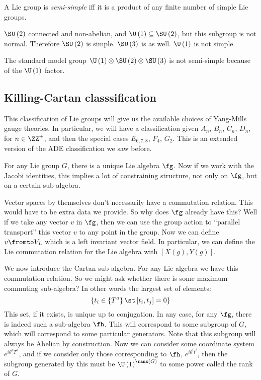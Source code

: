 \documentclass{booc}
\begin{document}
\begin{defn}
A Lie group is \emph{semi-simple} iff
it is a product of any finite number of simple Lie groups.
\end{defn}

\begin{exm}
$\SU\left( 2 \right)$ connected and non-abelian, 
and $\U\left( 1 \right)\subseteq \SU\left( 2 \right)$, 
but this subgroup is not normal.
Therefore $\SU\left( 2 \right)$ is simple. 
$\SU\left( 3 \right)$ is as well.
$\U\left( 1 \right)$ is not simple.
\end{exm}

\begin{exm}
The standard model group
$\U\left( 1 \right)\otimes \SU\left( 2 \right) \otimes \SU\left( 3 \right)$
is not semi-simple because of the $\U\left( 1 \right)$ factor.
\end{exm}

\subsection{Killing-Cartan classsification}

This classification of Lie groups
will give us the available choices of Yang-Mills gauge theories. 
In particular, we will have a classification given $A_n$, $B_n$, $C_n$, 
$D_n$, for $n\in \ZZ^+$, 
and then the special  cases $E_{6,7,8}$, 
$F_4$, $G_2$.
This is an extended version of the ADE classification we saw before.

For any Lie group $G$, 
there is a unique Lie algebra $\fg$. 
Now if we work with the Jacobi identities, this
implies a lot of constraining structure, not only on $\fg$, 
but on a certain sub-algebra.

Vector spaces by themselves don't necessarily have a commutation relation. 
This would have to be extra data we provide.
So why does $\fg$ already have this?
Well if we take any vector $v$ in $\fg$, then we can use the group action
to ``parallel transport'' this vector $v$ to any point in the group. 
Now we can define $v\fromto V_L$
which is a left invariant vector field.
In particular, we can define the Lie commutation relation for the Lie algebra
with $\left[ X\left( g \right) , Y\left( g \right) \right]$. 

We now introduce the Cartan sub-algebra. 
For any Lie algebra we have this commutation relation. 
So we might ask whether there is some maximum commuting sub-algebra?
In other words the largest set of elements:
\begin{equation}
\left\{ t_i \in \left\{ T^a \right\} \st
\left[ t_i , t_j \right] = 0
\right\}
\end{equation}
This set, if it exists, is unique up to conjugation.
In any case, for any $\fg$, there is indeed such a sub-algebra $\fh$. 
This will correspond to some subgroup of $G$, 
which will correspond to some particular generators.
Note that this subgroup will always be Abelian by construction.
Now we can consider some coordinate system $e^{i \theta^a T^a}$,
and if we consider only those corresponding to $\fh$,
$e^{i\theta^i t^i}$, then the subgroup generated by this must be 
$\U\left( 1 \right)^{\rank\left( G \right)}$ to some power called the rank of $G$.
\end{document}
